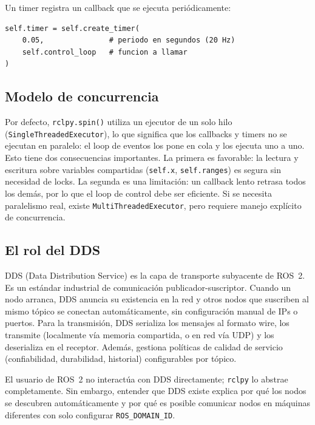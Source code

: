 Un timer registra un callback que se ejecuta periódicamente:

\begin{lstlisting}[style=python, caption={Registro de un timer de control a 20~Hz.}]
self.timer = self.create_timer(
    0.05,               # periodo en segundos (20 Hz)
    self.control_loop   # funcion a llamar
)
\end{lstlisting}

\subsection{Modelo de concurrencia}

Por defecto, \texttt{rclpy.spin()} utiliza un ejecutor de un solo hilo (\texttt{SingleThreadedExecutor}), lo que significa que los callbacks y timers no se ejecutan en paralelo: el loop de eventos los pone en cola y los ejecuta uno a uno. Esto tiene dos consecuencias importantes. La primera es favorable: la lectura y escritura sobre variables compartidas (\texttt{self.x}, \texttt{self.ranges}) es segura sin necesidad de locks. La segunda es una limitación: un callback lento retrasa todos los demás, por lo que el loop de control debe ser eficiente. Si se necesita paralelismo real, existe \texttt{MultiThreadedExecutor}, pero requiere manejo explícito de concurrencia.

\subsection{El rol del DDS}

DDS (Data Distribution Service) es la capa de transporte subyacente de ROS~2. Es un estándar industrial de comunicación publicador-suscriptor. Cuando un nodo arranca, DDS anuncia su existencia en la red y otros nodos que suscriben al mismo tópico se conectan automáticamente, sin configuración manual de IPs o puertos. Para la transmisión, DDS serializa los mensajes al formato wire, los transmite (localmente vía memoria compartida, o en red vía UDP) y los deserializa en el receptor. Además, gestiona políticas de calidad de servicio (confiabilidad, durabilidad, historial) configurables por tópico.

El usuario de ROS~2 no interactúa con DDS directamente; \texttt{rclpy} lo abstrae completamente. Sin embargo, entender que DDS existe explica por qué los nodos se descubren automáticamente y por qué es posible comunicar nodos en máquinas diferentes con solo configurar \texttt{ROS\_DOMAIN\_ID}.
